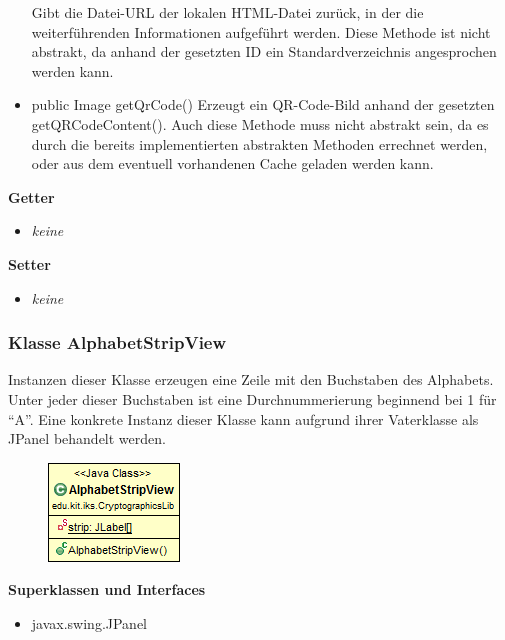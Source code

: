 \documentclass{article}
\begin{document}
\begin{itemize}
          Gibt die Datei-URL der lokalen HTML-Datei zurück, in der die weiterführenden
          Informationen aufgeführt werden. Diese Methode ist nicht abstrakt, da anhand
          der gesetzten ID ein Standardverzeichnis angesprochen werden kann.
        \item public Image getQrCode() \newline
          Erzeugt ein QR-Code-Bild anhand der gesetzten getQRCodeContent(). Auch diese Methode
          muss nicht abstrakt sein, da es durch die bereits implementierten abstrakten Methoden
          errechnet werden, oder aus dem eventuell vorhandenen Cache geladen werden kann.
      \end{itemize}
      
      \textbf{Getter}
      \begin{itemize}
		\item \textit{keine}
      \end{itemize}
      
      \textbf{Setter}
      \begin{itemize}
        \item \textit{keine}
      \end{itemize}
	
	\subsubsection{Klasse AlphabetStripView}
	  Instanzen dieser Klasse erzeugen eine Zeile mit den Buchstaben des Alphabets.
	  Unter jeder dieser Buchstaben ist eine Durchnummerierung beginnend bei 1 für ``A''.
	  Eine konkrete Instanz dieser Klasse kann aufgrund ihrer Vaterklasse als JPanel behandelt werden.
	
      \begin{figure}[H]
        \centering
        \includegraphics{resources/edu-kit-iks-CryptographicsLib-AlphabetStripView}
      \end{figure}
	
      \textbf{Superklassen und Interfaces}
      \begin{itemize}
        \item javax.swing.JPanel
      \end{itemize}
	
\end{document}
